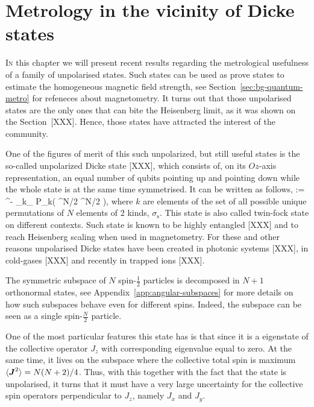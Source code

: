 \section{Metrology in the vicinity of Dicke states}


\lettrine[lines=2, findent=3pt,nindent=0pt]{I}{n} this chapter we will present recent results regarding the metrological usefulness of a family of unpolarised states.
Such states can be used as prove states to estimate the homogeneous magnetic field strength, see Section~\ref{sec:bg-quantum-metro} for refeneces about magnetometry.
It turns out that those unpolarised states are the only ones that can bite the Heisenberg limit, as it was shown on the Section~{[XXX]}.
Hence, those states have attracted the interest of the community.

One of the figures of merit of this such unpolarized, but still useful states is the so-called unpolarized Dicke state [XXX], which consists of, on its $Oz$-axis  representation, an equal number of qubits pointing up and pointing down while the whole state is at the same time symmetrised.
It can be written as follows,
\be
   \equiv {}:= ^{-}
  \sum_{k\in \sigma_}
  P_{k}\left( ^{\otimes N/2} ^{\otimes N/2}
  \right),
  \label{eq:vd-unpolarised-dicke}
\ee
where $k$ are elements of the set of all possible unique permutations of $N$ elements of 2 kinds, $\sigma_\text{s}$.
This state is also called twin-fock state on different contexts.
Such state is known to be highly entangled [XXX] and to reach Heisenberg scaling when used in magnetometry.
For these and other reasons unpolarised Dicke states have been created in photonic systems [XXX], in cold-gases [XXX] and recently in trapped ions [XXX].

The symmetric subspace of $N$ spin-$\frac{1}{2}$ particles is decomposed in $N+1$ orthonormal states, see Appendix~\ref{app:angular-subspaces} for more details on how such subspaces behave even for different spins.
Indeed, the subspace can be seen as a single spin-$\frac{N}{2}$ particle.

One of the most particular features this state has is that since it is a eigenstate of the collective operator $J_z$ with corresponding eigenvalue equal to zero.
At the same time, it lives on the subspace where the collective total spin is maximum\ie $\langle \boldsymbol{J}^2 \rangle=N(N+2)/4$.
Thus, with this together with the fact that the state is unpolarised, it turns that it must have a very large uncertainty for the collective spin operators perpendicular to $J_z$, namely $J_x$ and $J_y$.

